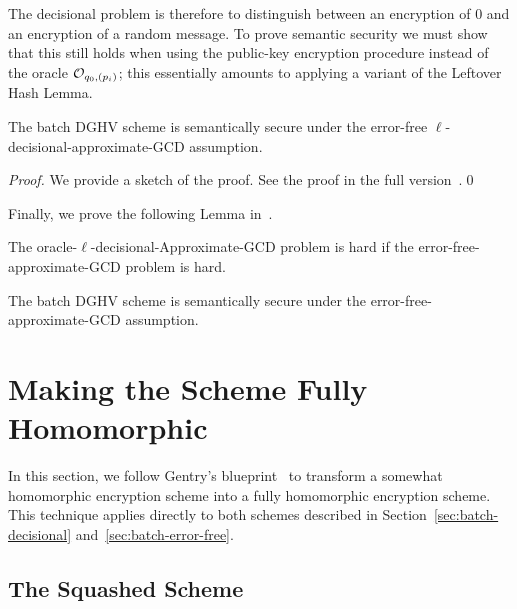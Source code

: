 \documentclass[11pt]{llncs}
\begin{document}
The decisional
problem is therefore to distinguish between an encryption of $0$ and
an encryption of a random message. To prove semantic security 
we must show that this  still holds when using the public-key
encryption procedure instead of the oracle ${\cal 
    O}_{q_0,(p_i)}$; this essentially amounts to applying a variant
                    of the Leftover Hash Lemma.

\begin{theorem}\label{thm:l-dAGC}
The batch DGHV scheme is semantically secure under the
error-free $\ell$-decisional-approximate-GCD assumption.
\end{theorem}

\begin{proof}
We provide a sketch of the proof. See the proof in the full version~\cite{CLT2013a}.\qed
\end{proof}

Finally, we prove the following Lemma in~\cite[Appendix~C]{CLT2013a}.

\begin{lemma}
\label{l:redsec}
The oracle-$\ell$-decisional-Approximate-GCD problem is hard if the
error-free-approximate-GCD problem is hard.
\end{lemma}

\begin{corollary}
The batch DGHV scheme is semantically secure under the
error-free-approximate-GCD assumption.
\end{corollary}


\section{Making the Scheme Fully Homomorphic}

In this section, we follow Gentry's blueprint~\cite{GenPhD} to
transform a somewhat homomorphic encryption scheme into a fully
homomorphic encryption scheme. This technique applies directly to 
both schemes described in Section~\ref{sec:batch-decisional} 
and~\ref{sec:batch-error-free}.

\subsection{The Squashed Scheme}\label{subsec:squashing}
\end{document}
